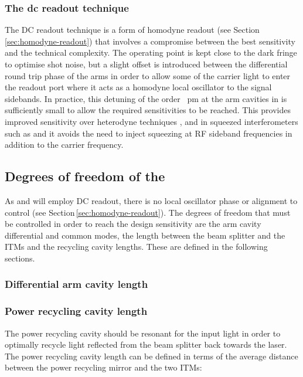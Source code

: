 \subsubsection{The dc readout technique}
The \gls{DC} readout technique is a form of homodyne readout (see Section\,\ref{sec:homodyne-readout}) that involves a compromise between the best sensitivity and the technical complexity. The operating point is kept close to the dark fringe to optimise shot noise, but a slight offset is introduced between the differential round trip phase of the arms in order to allow some of the carrier light to enter the readout port where it acts as a homodyne local oscillator to the signal sidebands. In practice, this detuning \textemdash of the order \SI{}{\pico\meter} at the arm cavities in \ALIGO{}\textemdash is sufficiently small to allow the required sensitivities to be reached. This provides improved sensitivity over heterodyne techniques \cite{Fricke2012}, and in squeezed interferometers such as \ETLF{} and \ETHF{} it avoids the need to inject squeezing at \gls{RF} sideband frequencies in addition to the carrier frequency.

\subsection{\label{sec:dofs-of-drfpmi}Degrees of freedom of the \DRFPMI{}}
As \ETLF{} and \ETHF{} will employ \gls{DC} readout, there is no local oscillator phase or alignment to control (see Section\,\ref{sec:homodyne-readout}). The degrees of freedom that must be controlled in order to reach the design sensitivity are the arm cavity differential and common modes, the length between the beam splitter and the \glspl{ITM} and the recycling cavity lengths. These are defined in the following sections.

\subsubsection{Differential arm cavity length}

\subsubsection{Power recycling cavity length}
The power recycling cavity should be resonant for the input light in order to optimally recycle light reflected from the beam splitter back towards the laser. The power recycling cavity length can be defined in terms of the average distance between the power recycling mirror and the two \glspl{ITM}:

